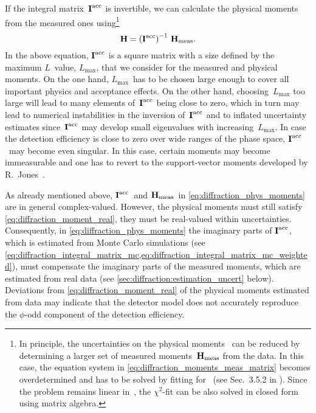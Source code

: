 If the integral matrix~$\bm{\mathrm{I}}^\text{acc}$ is invertible, we can
calculate the physical moments from the measured ones
using\footnote{In principle, the uncertainties on the physical
moments~ can be reduced by determining a larger set of
measured moments~$\bm{\mathrm{H}}_\text{meas}$ from the data.  In this case,
the equation system in \cref{eq:diffraction_moments_meas_matrix}
becomes overdetermined and has to be solved by fitting for~
(see \eg Sec.~3.5.2 in ).  Since the problem
remains linear in~, the $\chi^2$-fit can be also solved in
closed form using matrix algebra.}
\begin{equation}
  \label{eq:diffraction_phys_moments}
  \vect{H}
  = \rBrk[0]{\mat{I}^\text{acc}}^{-1}\, \vect{H}_\text{meas}.
\end{equation}
In the above equation, $\bm{\mathrm{I}}^\text{acc}$ is a square matrix with a
size defined by the maximum $L$~value, $L_\text{max}$, that we
consider for the measured and physical moments.  On the one hand,
$L_\text{max}$~has to be chosen large enough to cover all important
physics and acceptance effects.  On the other hand,
choosing~$L_\text{max}$ too large will lead to many elements
of~$\bm{\mathrm{I}}^\text{acc}$ being close to zero, which in turn may lead to
numerical instabilities in the inversion of~$\bm{\mathrm{I}}^\text{acc}$ and
to inflated uncertainty estimates since~$\bm{\mathrm{I}}^\text{acc}$ may
develop small eigenvalues with increasing~$L_\text{max}$.  In case the
detection efficiency is close to zero over wide ranges of the phase
space, $\bm{\mathrm{I}}^\text{acc}$~may become even singular.  In this case,
certain moments may become immeasurable and one has to revert to the
support-vector moments developed by R.~Jones~\cite{Jones:2023}.

As already mentioned above, $\bm{\mathrm{I}}^\text{acc}$~and
$\bm{\mathrm{H}}_\text{meas}$~in \cref{eq:diffraction_phys_moments} are in
general complex-valued.  However, the physical moments must still
satisfy \cref{eq:diffraction_moment_real}, \ie they must be
real-valued within uncertainties.  Consequently, in
\cref{eq:diffraction_phys_moments} the imaginary parts of
$\bm{\mathrm{I}}^\text{acc}$, which is estimated from Monte Carlo simulations
(see
\cref{eq:diffraction_integral_matrix_mc,eq:diffraction_integral_matrix_mc_weighted}),
must compensate the imaginary parts of the measured moments, which are
estimated from real data (see \cref{sec:diffraction:estimation_uncert}
below).  Deviations from \cref{eq:diffraction_moment_real} of the
physical moments estimated from data may indicate that the detector
model does not accurately reproduce the $\phi$-odd component of the
detection efficiency.


